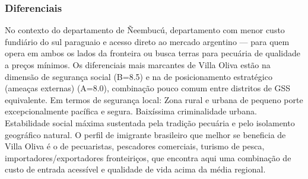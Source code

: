 \subsubsection*{Diferenciais}\label{dif-villa-oliva-1215}
No contexto do departamento de Ñeembucú, departamento com menor custo fundiário do sul paraguaio e acesso direto ao mercado argentino — para quem opera em ambos os lados da fronteira ou busca terras para pecuária de qualidade a preços mínimos. Os diferenciais mais marcantes de Villa Oliva estão na dimensão de segurança social (B=8.5) e na de posicionamento estratégico (ameaças externas) (A=8.0), combinação pouco comum entre distritos de GSS equivalente. Em termos de segurança local: Zona rural e urbana de pequeno porte excepcionalmente pacífica e segura. Baixíssima criminalidade urbana. Estabilidade social máxima sustentada pela tradição pecuária e pelo isolamento geográfico natural. O perfil de imigrante brasileiro que melhor se beneficia de Villa Oliva é o de pecuaristas, pescadores comerciais, turismo de pesca, importadores/exportadores fronteiriços, que encontra aqui uma combinação de custo de entrada acessível e qualidade de vida acima da média regional.
